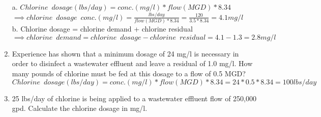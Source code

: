 \begin{enumerate}
a. $Chlorine \enspace dosage (lbs/day)=conc. (mg/l)*flow(MGD)*8.34$\\
\vspace{0.25cm}
$\implies chlorine \enspace dosage \enspace conc. (mg/l)=\frac{lbs/day}{flow(MGD)*8.34}=\frac{120}{3.5*8.34}=\boxed{4.1mg/l}$\\
\vspace{0.25cm}
b. Chlorine dosage = chlorine demand + chlorine residual\\
\vspace{0.25cm}
$ \implies chlorine \enspace demand = chlorine \enspace dosage - chlorine \enspace residual=4.1-1.3=\boxed{2.8mg/l}$\\
\vspace{0.25cm}

\item Experience has shown that a minimum dosage of 24 mg/l is necessary in order to disinfect a wastewater effluent and leave a residual of 1.0 mg/l. How many pounds of chlorine must be fed at this dosage to a flow of 0.5 MGD?\\

$Chlorine \enspace dosage (lbs/day)=conc. (mg/l)*flow(MGD)*8.34=24*0.5*8.34=\boxed{100lbs/day}$\\
\vspace{0.25cm}
\item 25 lbs/day of chlorine is being applied to a wastewater effluent flow of 250,000 gpd. Calculate the chlorine dosage in mg/l.\\


\end{enumerate}
